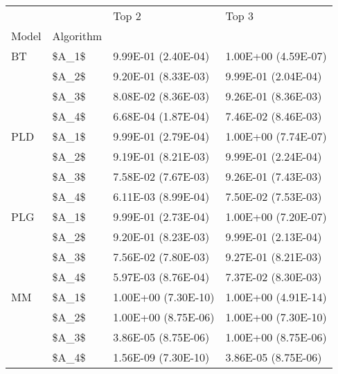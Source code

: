\begin{tabular}{llll}
\toprule
   &       &                Top 2 &                Top 3 \\
Model & Algorithm &                      &                      \\
\midrule
BT & \$A\_1\$ &  9.99E-01 (2.40E-04) &  1.00E+00 (4.59E-07) \\
   & \$A\_2\$ &  9.20E-01 (8.33E-03) &  9.99E-01 (2.04E-04) \\
   & \$A\_3\$ &  8.08E-02 (8.36E-03) &  9.26E-01 (8.36E-03) \\
   & \$A\_4\$ &  6.68E-04 (1.87E-04) &  7.46E-02 (8.46E-03) \\
PLD & \$A\_1\$ &  9.99E-01 (2.79E-04) &  1.00E+00 (7.74E-07) \\
   & \$A\_2\$ &  9.19E-01 (8.21E-03) &  9.99E-01 (2.24E-04) \\
   & \$A\_3\$ &  7.58E-02 (7.67E-03) &  9.26E-01 (7.43E-03) \\
   & \$A\_4\$ &  6.11E-03 (8.99E-04) &  7.50E-02 (7.53E-03) \\
PLG & \$A\_1\$ &  9.99E-01 (2.73E-04) &  1.00E+00 (7.20E-07) \\
   & \$A\_2\$ &  9.20E-01 (8.23E-03) &  9.99E-01 (2.13E-04) \\
   & \$A\_3\$ &  7.56E-02 (7.80E-03) &  9.27E-01 (8.21E-03) \\
   & \$A\_4\$ &  5.97E-03 (8.76E-04) &  7.37E-02 (8.30E-03) \\
MM & \$A\_1\$ &  1.00E+00 (7.30E-10) &  1.00E+00 (4.91E-14) \\
   & \$A\_2\$ &  1.00E+00 (8.75E-06) &  1.00E+00 (7.30E-10) \\
   & \$A\_3\$ &  3.86E-05 (8.75E-06) &  1.00E+00 (8.75E-06) \\
   & \$A\_4\$ &  1.56E-09 (7.30E-10) &  3.86E-05 (8.75E-06) \\
\bottomrule
\end{tabular}
